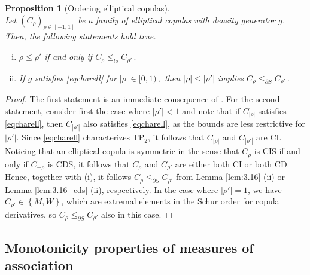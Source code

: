 \documentclass{article}
\newtheorem{proposition}[theorem]{Proposition}
\def\abs#1{\left\lvert#1\right\rvert} %
\def\setof#1{\left\{#1\right\}} %
\newcommand{\TP}{\mathrm{TP_2}}
\begin{document}
\begin{proposition}[Ordering elliptical copulas]\label{prop:ordering_elliptical_copulas}~\\
    Let \((C_\rho)_{\rho\in [-1,1]}\) be a family of elliptical copulas with density generator $g$.
    Then, the following statements hold true.
    \begin{enumerate}[(i)]
        \item \label{ord_ell_cop_1} \(\rho\leq \rho'\) if and only if \(C_\rho\leq_{lo} C_{\rho'}\,.\)
        \item If \(g\) satisfies \eqref{eqcharell} for \(|\rho|\in [0,1)\,,\) then \(|\rho| \leq |\rho'|\) implies \(C_{\rho}\leq_{\partial S} C_{\rho'}\,.\)
    \end{enumerate}
\end{proposition}
\begin{proof}
    The first statement is an immediate consequence of \cite[Theorem 2.21]{Joe-1997}.
    For the second statement, consider first the case where $ |\rho'|<1$ and note that if $C_{|\rho|}$ satisfies \eqref{eqcharell}, then $C_{|\rho'|}$ also satisfies \eqref{eqcharell}, as the bounds are less restrictive for $|\rho'|$.
    Since \eqref{eqcharell} characterizes $\TP$, it follows that $C_{|\rho|}$ and $C_{|\rho'|}$ are CI.
    Noticing that an elliptical copula is symmetric in the sense that $C_{\rho}$ is CIS if and only if $C_{-\rho}$ is CDS, it follows that $C_{\rho}$ and $C_{\rho'}$ are either both CI or both CD. 
    Hence, together with (i), it follows \(C_{\rho}\leq_{\partial S} C_{\rho'}\) from Lemma \ref{lem:3.16} (ii) or Lemma \ref{lem:3.16_cds} (ii), respectively.
    In the case where $\abs{\rho'}=1$, we have $C_{\rho'}\in\setof{M, W}$, which are extremal elements in the Schur order for copula derivatives, so $C_{\rho} \leq_{\partial S} C_{\rho'}$ also in this case.
\end{proof}

\subsection{Monotonicity properties of measures of association}\label{secmoa}
\end{document}

